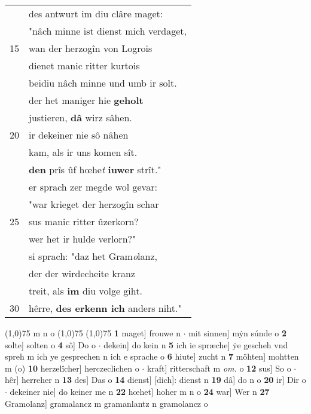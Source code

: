 \documentclass[8pt,a4paper,notitlepage]{article}
\begin{document}
\begin{table}[ht]
\begin{minipage}[t]{0.5\linewidth}
\begin{tabular}{rl}
 & des antwurt im diu clâre maget:\\ 
 & "nâch minne ist dienst mich verdaget,\\ 
15 & wan der herzogîn von Logrois\\ 
 & dienet manic ritter kurtois\\ 
 & beidiu nâch minne und umb ir solt.\\ 
 & der het maniger hie \textbf{geholt}\\ 
 & justieren, \textbf{dâ} wirz sâhen.\\ 
20 & ir dekeiner nie sô nâhen\\ 
 & kam, als ir uns komen sît.\\ 
 & \textbf{den} prîs ûf hœhe\textit{t} \textbf{iuwer} strît."\\ 
 & er sprach zer megde wol gevar:\\ 
 & "war krieget der herzogîn schar\\ 
25 & sus manic ritter ûzerkorn?\\ 
 & wer het ir hulde verlorn?"\\ 
 & si sprach: "daz het Gram\textit{o}lanz,\\ 
 & der der wirdecheite kranz\\ 
 & treit, als \textbf{im} diu volge giht.\\ 
30 & hêrre, \textbf{des erkenn ich} anders niht."\\ 
\end{tabular}
\scriptsize
\line(1,0){75} \newline
m n o \newline
\line(1,0){75} \newline
\newline
\line(1,0){75} \newline
\textbf{1} maget] frouwe n  $\cdot$ mit sinnen] mẏn súnde o \textbf{2} solte] solten o \textbf{4} sô] Do o  $\cdot$ dekein] do kein n \textbf{5} ich ie spræche] ẏe gescheh vnd spreh m ich ye gesprechen n ich e sprache o \textbf{6} hiute] zucht n \textbf{7} möhten] mohtten m (o) \textbf{10} herzelîcher] herczeclichen o  $\cdot$ kraft] ritterschaft m \textit{om.} o \textbf{12} sus] So o  $\cdot$ hêr] herreher n \textbf{13} des] Das o \textbf{14} dienst] [dich]: dienst n \textbf{19} dâ] do n o \textbf{20} ir] Dir o  $\cdot$ dekeiner nie] do keiner me n \textbf{22} hœhet] hoher m n o \textbf{24} war] Wer n \textbf{27} Gramolanz] gramalancz m gramanlantz n gramolancz o \newline
\end{minipage}
\end{table}
\end{document}
